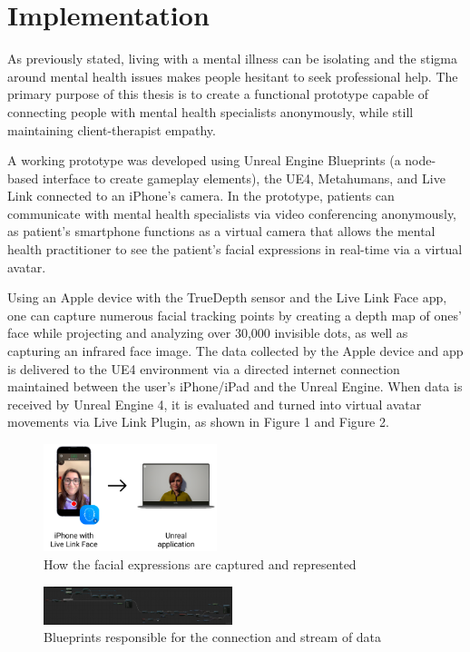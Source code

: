 \section{Implementation}
As previously stated, living with a mental illness can be isolating and the stigma around mental health issues makes people hesitant to seek professional help. The primary purpose of this thesis is to create a functional prototype capable of connecting people with mental health specialists anonymously, while still maintaining client-therapist empathy.

A working prototype was developed using Unreal Engine Blueprints (a node-based interface to create gameplay elements), the UE4, Metahumans, and Live Link connected to an iPhone's camera. In the prototype, patients can communicate with mental health specialists via video conferencing anonymously, as patient's smartphone functions as a virtual camera that allows the mental health practitioner to see the patient's facial expressions in real-time via a virtual avatar. 

Using an Apple device with the TrueDepth sensor and the Live Link Face app, one can capture numerous facial tracking points by creating a depth map of ones’ face while projecting and analyzing over 30,000 invisible dots, as well as capturing an infrared face image. The data collected by the Apple device and app is delivered to the UE4 environment via a directed internet connection maintained between the user's iPhone/iPad and the Unreal Engine. When data is received by Unreal Engine 4, it is evaluated and turned into virtual avatar movements via Live Link Plugin, as shown in Figure 1 and Figure 2.

\begin{figure}[h!]
\includegraphics[width=0.45\textwidth]{figures/howItWorks.png}
\centering
\caption{How the facial expressions are captured and represented}
\end{figure}

\begin{figure}[h!]
\includegraphics[width=0.49\textwidth]{figures/hereItBegins.png}
\centering
\caption{Blueprints responsible for the connection and stream of data}
\end{figure}

